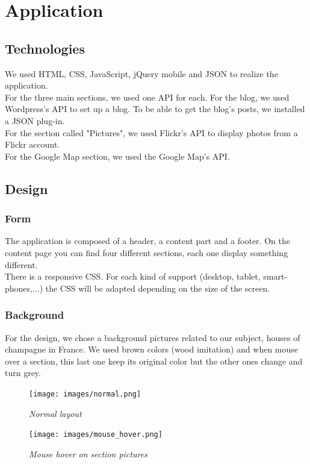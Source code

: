 \documentclass[12pt]{report}%
\begin{document}
\tableofcontents

\listoffigures


\chapter{Application}
\section{Technologies}
We used HTML, CSS, JavaScript, jQuery mobile and JSON to realize the application.\\
For the three main sections, we used one API for each. For the blog, we used Wordpress's API to set up a blog. To be able to get the blog's posts, we installed a JSON plug-in.\\
For the section called "Pictures", we used Flickr's API to display photos from a Flickr account.\\
For the Google Map section, we used the Google Map's API.
\section{Design}
\subsection{Form}
The application is composed of a header, a content part and a footer. On the content page you can find four different sections, each one display something different.\\
There is a responsive CSS. For each kind of support (desktop, tablet, smart-phones,...) the CSS will be adapted depending on the size of the screen.
\subsection{Background}
For the design, we chose a background pictures related to our subject, houses of champagne in France. We used brown colors (wood imitation) and when mouse over a section, this last one keep its original color but the other ones change and turn grey.
\begin{figure}[h]
    \begin{minipage}[c]{.45\linewidth}
        \centering
        \texttt{[image: images/normal.png]}
        \caption{\it Normal layout}
    \end{minipage}
    \hfill%
    \begin{minipage}[c]{.45\linewidth}
        \centering
        \texttt{[image: images/mouse\_hover.png]}
        \caption{\it Mouse hover on section pictures}
    \end{minipage}
\end{figure} 
\end{document}
